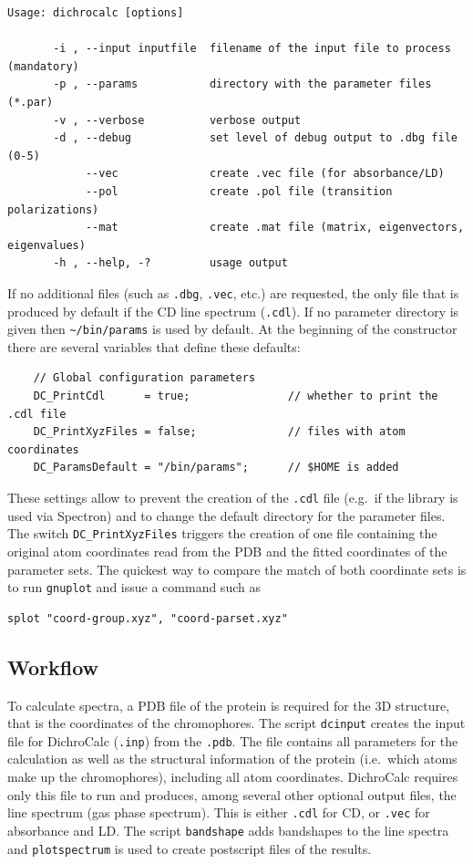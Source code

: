 \documentclass[11pt, letterpaper]{article}
\begin{document}
\begin{verbatim}
Usage: dichrocalc [options]

       -i , --input inputfile  filename of the input file to process (mandatory)
       -p , --params           directory with the parameter files (*.par)
       -v , --verbose          verbose output
       -d , --debug            set level of debug output to .dbg file (0-5)
            --vec              create .vec file (for absorbance/LD)
            --pol              create .pol file (transition polarizations)
            --mat              create .mat file (matrix, eigenvectors, eigenvalues)
       -h , --help, -?         usage output
\end{verbatim}

If no additional files (such as \verb'.dbg', \verb'.vec', etc.) are requested, the only file that is produced by default if the CD line spectrum (\verb'.cdl'). If no parameter directory is given then \verb'~/bin/params' is used by default. At the beginning of the constructor there are several variables that define these defaults:

\begin{verbatim}
	// Global configuration parameters
	DC_PrintCdl      = true;               // whether to print the .cdl file
	DC_PrintXyzFiles = false;              // files with atom coordinates
	DC_ParamsDefault = "/bin/params";      // $HOME is added  
\end{verbatim}

These settings allow to prevent the creation of the \verb'.cdl' file (e.g.\ if the library is used via Spectron) and to change the default directory for the parameter files. The switch \verb'DC_PrintXyzFiles' triggers the creation of one file containing the original atom coordinates read from the PDB and the fitted coordinates of the parameter sets. The quickest way to compare the match of both coordinate sets is to run \verb'gnuplot' and issue a command such as
\begin{verbatim}
splot "coord-group.xyz", "coord-parset.xyz"
\end{verbatim}



\subsection{Workflow}

To calculate spectra, a PDB file of the protein is required for the 3D structure, that is the coordinates of the chromophores. The script \verb'dcinput' creates the input file for DichroCalc (\verb'.inp') from the \verb'.pdb'. The file contains all parameters for the calculation as well as the structural information of the protein (i.e.\ which atoms make up the chromophores), including all atom coordinates. DichroCalc requires only this file to run and produces, among several other optional output files, the line spectrum (gas phase spectrum). This is either \verb'.cdl' for CD, or \verb'.vec' for absorbance and LD. The script \verb'bandshape' adds bandshapes to the line spectra and \verb'plotspectrum' is used to create postscript files of the results.
\end{document}
